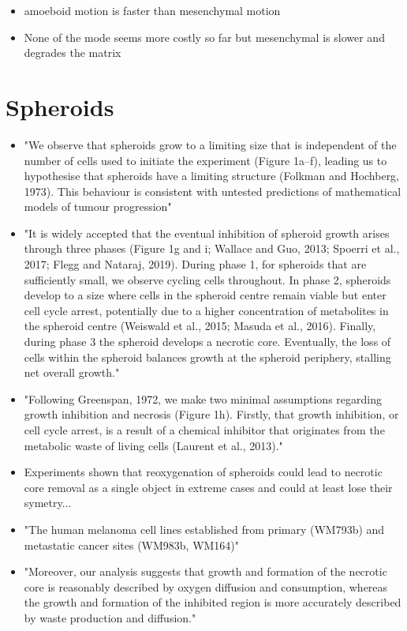 \documentclass[11pt,a4paper]{article}
\begin{document}
\begin{itemize}
\item amoeboid motion is faster than mesenchymal motion \cite{Wu2021}
\item None of the mode seems more costly so far but mesenchymal is slower and degrades the matrix
\end{itemize}

\section{Spheroids}
\begin{itemize}
\item "We observe that spheroids grow to a limiting size that is independent of the number of cells used to initiate the experiment (Figure 1a–f), leading us to hypothesise that spheroids have a limiting structure (Folkman and Hochberg, 1973). This behaviour is consistent with untested predictions of mathematical models of tumour progression"\cite{Browning2021}
\item "It is widely accepted that the eventual inhibition of spheroid growth arises through three phases (Figure 1g and i; Wallace and Guo, 2013; Spoerri et al., 2017; Flegg and Nataraj, 2019). During phase 1, for spheroids that are sufficiently small, we observe cycling cells throughout. In phase 2, spheroids develop to a size where cells in the spheroid centre remain viable but enter cell cycle arrest, potentially due to a higher concentration of metabolites in the spheroid centre (Weiswald et al., 2015; Masuda et al., 2016). Finally, during phase 3 the spheroid develops a necrotic core. Eventually, the loss of cells within the spheroid balances growth at the spheroid periphery, stalling net overall growth."\cite{Browning2021}
\item "Following Greenspan, 1972, we make two minimal assumptions regarding growth inhibition and necrosis (Figure 1h). Firstly, that growth inhibition, or cell cycle arrest, is a result of a chemical inhibitor that originates from the metabolic waste of living cells (Laurent et al., 2013)."\cite{Browning2021}
\item Experiments shown that reoxygenation of spheroids could lead to necrotic core removal as a single object in extreme cases and could at least lose their symetry...\cite{Murphy2023}
\item "The human melanoma cell lines established from primary (WM793b) and metastatic cancer sites (WM983b, WM164)"\cite{Murphy2023}
\item "Moreover, our analysis suggests that growth and formation of the necrotic core is reasonably described by oxygen diffusion and consumption, whereas the growth and formation of the inhibited region is more accurately described by waste production and diffusion."\cite{Murphy2023}

\end{itemize}
\end{document}
